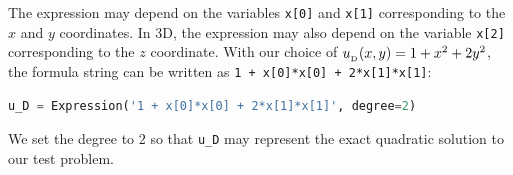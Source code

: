 \documentclass[graybox,envcountchap,sectrefs,final]{svmonodo}
\begin{document}
The expression may depend on the variables \texttt{x[0]} and \texttt{x[1]}
corresponding to the $x$ and $y$ coordinates. In 3D, the expression
may also depend on the variable \texttt{x[2]} corresponding to the $z$
coordinate. With our choice of $\ub(x,y)=1 + x^2 + 2y^2$, the formula
string can be written as \texttt{1 + x[0]*x[0] + 2*x[1]*x[1]}:

\begin{lstlisting}[language=Python,style=graycolor]
u_D = Expression('1 + x[0]*x[0] + 2*x[1]*x[1]', degree=2)
\end{lstlisting}

We set the degree to $2$ so that \Verb!u_D! may represent the exact
quadratic solution to our test problem.

\end{document}
